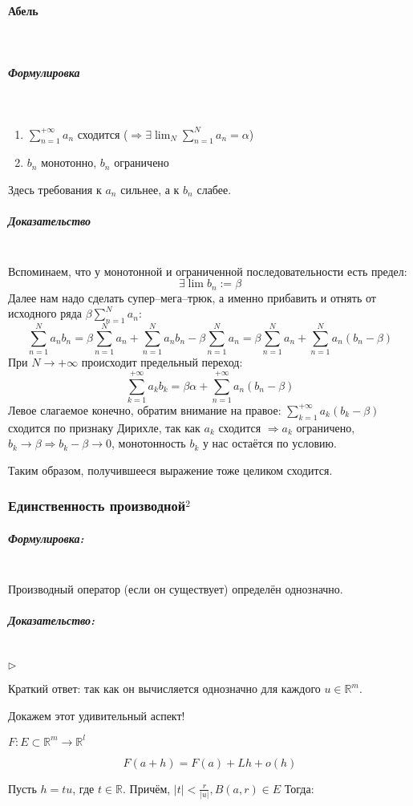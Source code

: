 \documentclass{article}
\let\vanillaparagraph\paragraph
\let\vanillasubparagraph\subparagraph
\renewcommand{\paragraph}[1]{\vanillaparagraph{#1}\mbox{}\\}
\renewcommand{\subparagraph}[1]{\vanillasubparagraph{#1}\mbox{}\\}
\begin{document}
\paragraph{Абель}
\subparagraph{Формулировка}
\begin{enumerate}
    \item $\sum_{n=1}^{+\infty} a_n$ сходится ($\Rightarrow \exists \lim_N \sum_{n=1}^{N} a_n = \alpha$)
    \item $b_n$ монотонно, $b_n$ ограничено
\end{enumerate}
Здесь требования к $a_n$ сильнее, а к $b_n$ слабее.
\subparagraph{Доказательство}
Вспоминаем, что у монотонной и ограниченной последовательности есть предел:
$$
\exists \lim b_n := \beta
$$
Далее нам надо сделать супер--мега--трюк, а именно прибавить и отнять от исходного ряда $\beta\sum_{n=1}^N a_n$:
$$
\sum_{n=1}^N a_n b_n = \beta\sum_{n=1}^N a_n + \sum_{n=1}^{N} a_n b_n - \beta\sum_{n=1}^N a_n = \beta\sum_{n=1}^N a_n + \sum_{n=1}^{N} a_n (b_n - \beta)
$$
При $N \rightarrow +\infty$ происходит предельный переход:
$$
\sum_{k=1}^{+\infty} a_k b_k = \beta\alpha + \sum_{n=1}^{+\infty} a_n (b_n - \beta)
$$
Левое слагаемое конечно, обратим внимание на правое: $\sum_{k=1}^{+\infty} a_k (b_k - \beta)$ сходится по признаку Дирихле, так как $a_k$ сходится $\Rightarrow a_k$ ограничено, $b_k \rightarrow \beta \Rightarrow b_k - \beta \rightarrow 0$, монотонность $b_k$ у нас остаётся по условию.

Таким образом, получившееся выражение тоже целиком сходится.


\subsubsection{Единственность производной\texorpdfstring{$^2$}{}}

\subparagraph{Формулировка: }

Производный оператор (если он существует) определён однозначно.

\subparagraph{Доказательство: }

$\rhd$

Краткий ответ: так как он вычисляется однозначно для каждого $u \in \mathbb{R}^m$.

Докажем этот удивительный аспект!

$F: E \subset \mathbb{R}^m \rightarrow \mathbb{R}^l$

\[F(a + h) = F(a) + Lh + o(h)\]

Пусть $h = tu$, где $t \in \mathbb{R}$. Причём, $|t| < \frac{r}{|u|}, B(a, r) \in E$ Тогда:
\end{document}
